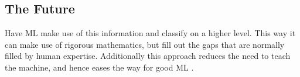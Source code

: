 \documentclass[main.tex]{subfiles}
\begin{document}
      \subsection{The Future}
      
        Have ML make use of this information and classify on a higher level. This way it can make use of rigorous mathematics, but fill out the gaps that are normally filled by human expertise. Additionally this approach reduces the need to teach the machine, and hence eases the way for good ML \cite{}.
    
\end{document}
